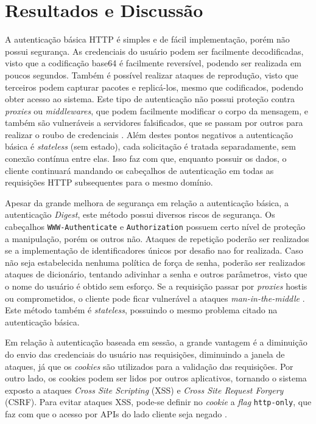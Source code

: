 \section{Resultados e Discussão}

A autenticação básica HTTP é simples e de fácil implementação, porém não possui segurança. As 
credenciais do usuário podem ser facilmente decodificadas, visto que a codificação base64 é 
facilmente reversível, podendo ser realizada em poucos segundos. Também é possível realizar ataques 
de reprodução, visto que terceiros podem capturar pacotes e replicá-los, mesmo que codificados, 
podendo obter acesso ao sistema. Este tipo de autenticação não possui proteção contra \emph{proxies} 
ou \emph{middlewares}, que podem facilmente modificar o corpo da mensagem, e também são vulneráveis 
a servidores falsificados, que se passam por outros para realizar o roubo de credenciais 
\cite{GOURLEY2002}. Além destes pontos negativos a autenticação básica é \emph{stateless} (sem 
estado), cada solicitação é tratada separadamente, sem conexão contínua entre elas. Isso faz com 
que, enquanto possuir os dados, o cliente continuará mandando os cabeçalhos de autenticação em 
todas as requisições HTTP subsequentes para o mesmo domínio.

Apesar da grande melhora de segurança em relação a autenticação básica, a autenticação 
\emph{Digest}, este método possui diversos riscos de segurança. Os cabeçalhos 
\texttt{WWW-Authenticate} e \texttt{Authorization} possuem certo nível de proteção a manipulação, 
porém os outros não. Ataques de repetição poderão ser realizados se a implementação de 
identificadores únicos por desafio nao for realizada. Caso não seja estabelecida nenhuma política de 
força de senha, poderão ser realizados ataques de dicionário, tentando adivinhar a senha e outros 
parâmetros, visto que o nome do usuário é obtido sem esforço. Se a requisição passar por 
\emph{proxies} hostis ou comprometidos, o cliente pode ficar vulnerável a ataques 
\emph{man-in-the-middle} \cite{GOURLEY2002}. Este método também é \emph{stateless}, possuindo o 
mesmo problema citado na autenticação básica.

Em relação à autenticação baseada em sessão, a grande vantagem é a diminuição do envio das 
credenciais do usuário nas requisições, diminuindo a janela de ataques, já que os \emph{cookies} 
são utilizados para a validação das requisições. Por outro lado, os cookies podem ser lidos por 
outros aplicativos, tornando o sistema exposto a ataques \emph{Cross Site Scripting} (XSS) e 
\emph{Cross Site Request Forgery} (CSRF). Para evitar ataques XSS, pode-se definir no \emph{cookie} 
a \emph{flag} \texttt{http-only}, que faz com que o acesso por APIs do lado cliente seja negado 
\cite{PAPATHANASAKI2022}.

